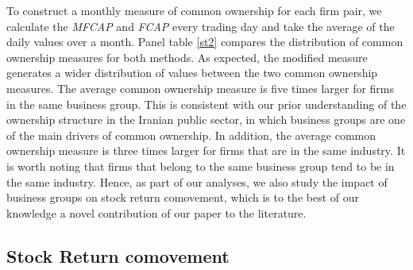 To construct a monthly measure of common ownership for each firm pair, we calculate the \textit{MFCAP} and \textit{FCAP} every trading day and take the average of the daily values over a month. Panel  table \ref{st2} compares the distribution of common ownership measures for both methods. As expected, the modified measure generates a wider distribution of values between the two common ownership measures. The average common ownership measure is five times larger for firms in the same business group. This is consistent with our prior understanding of the ownership structure in the Iranian public sector, in which business groups are one of the main drivers of common ownership. In addition, the average common ownership measure is three times larger for firms that are in the same industry. It is worth noting that firms that belong to the same business group tend to be in the same industry. Hence, as part of our analyses, we also study the impact of business groups on stock return comovement, which is to the best of our knowledge a novel contribution of our paper to the literature.

%		
		
\FloatBarrier
\subsection{{Stock Return comovement}}
\label{comovement}

